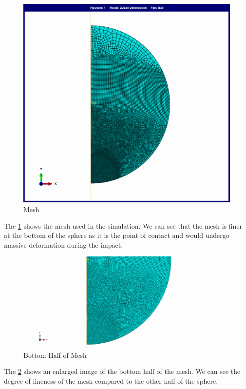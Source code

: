 \begin{figure}
    \centering
	\includegraphics[scale=0.075]{../images/Mesh/Mesh.png}
	\caption{Mesh}
	\label{fig:mesh}
\end{figure}

The \ref{fig:mesh} shows the mesh used in the simulation. We can see that the mesh is finer at the bottom of the sphere as it is the point of contact and would undergo massive deformation during the impact. 

\begin{figure}
    \centering
	\includegraphics[scale=0.075]{../images/Mesh/Mesh_Bottom_Half_lowRes.png}
	\caption{Bottom Half of Mesh}
	\label{fig:mesh_bottom_half}
\end{figure}

The \ref{fig:mesh_bottom_half} shows an enlarged image of the bottom half of the mesh. We can see the degree of fineness of the mesh compared to the other half of the sphere.


